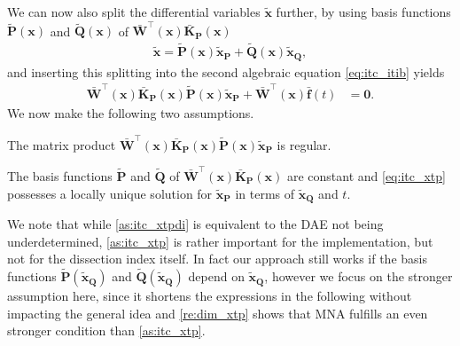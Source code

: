 \documentclass[AMA,STIX1COL]{WileyNJD-v2}
\newcommand{\mb}[1]{\mathbf{#1}}
\newcommand{\mbt}[1]{\tilde{\mathbf{#1}}}
\newcommand{\mbb}[1]{\bar{\mathbf{#1}}}
\newcommand{\T}{{\!\top}}
\begin{document}
We can now also split the differential variables $\mbt{x}$ further, by using basis functions $\mbt{P}(\mb{x})$ and $\mbt{Q}(\mb{x})$ of $\mbb{W}^\T (\mb{x}) \mbb{K}_\mb{P}(\mb{x})$
\begin{align}
    \mbt{x} = \mbt{P}(\mb{x}) \mbt{x}_\mb{P} +
    \mbt{Q}(\mb{x}) \mbt{x}_\mb{Q}, \label{eq:itc_xt}
\end{align}
and inserting this splitting into the second algebraic equation \eqref{eq:itc_itib} yields
\begin{align}
    \mbb{W}^\T (\mb{x}) \mbb{K}_\mb{P}(\mb{x}) \mbt{P}(\mb{x}) \mbt{x}_\mb{P} + \mbb{W}^\T (\mb{x}) \mbb{f}(t) &= \mb{0}. \label{eq:itc_xtp}
\end{align}
We now make the following two assumptions.
\begin{assumption}
    \label{as:itc_xtpdi}
    The matrix product $\mbb{W}^\T (\mb{x}) \mbb{K}_\mb{P}(\mb{x}) \mbt{P}(\mb{x}) \mbt{x}_\mb{P}$ is regular.
\end{assumption}
\begin{assumption}
    \label{as:itc_xtp}
    The basis functions $\mbt{P}$ and $\mbt{Q}$ of $\mbb{W}^\T (\mb{x}) \mbb{K}_\mb{P}(\mb{x})$ are constant and \eqref{eq:itc_xtp} possesses a locally unique solution for $\mbt{x}_\mb{P}$ in terms of $\mbt{x}_\mb{Q}$ and $t$.
\end{assumption}
We note that while \autoref{as:itc_xtpdi} is equivalent to the DAE not being underdetermined\cite{jansen2014}, \autoref{as:itc_xtp} is rather important for the implementation, but not for the dissection index itself. In fact our approach still works if the basis functions $\mbt{P}(\mbt{x}_\mb{Q})$ and $\mbt{Q}(\mbt{x}_\mb{Q})$ depend on $\mbt{x}_\mb{Q}$, however we focus on the stronger assumption here, since it shortens the expressions in the following without impacting the general idea and \autoref{re:dim_xtp} shows that MNA fulfills an even stronger condition than \autoref{as:itc_xtp}.
\end{document}
